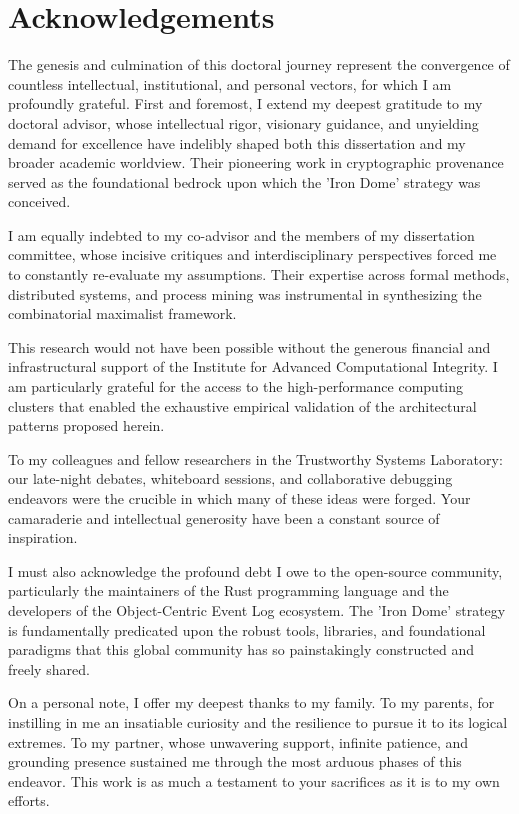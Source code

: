 \chapter*{Acknowledgements}
The genesis and culmination of this doctoral journey represent the convergence of countless intellectual, institutional, and personal vectors, for which I am profoundly grateful. First and foremost, I extend my deepest gratitude to my doctoral advisor, whose intellectual rigor, visionary guidance, and unyielding demand for excellence have indelibly shaped both this dissertation and my broader academic worldview. Their pioneering work in cryptographic provenance served as the foundational bedrock upon which the 'Iron Dome' strategy was conceived.

I am equally indebted to my co-advisor and the members of my dissertation committee, whose incisive critiques and interdisciplinary perspectives forced me to constantly re-evaluate my assumptions. Their expertise across formal methods, distributed systems, and process mining was instrumental in synthesizing the combinatorial maximalist framework. 

This research would not have been possible without the generous financial and infrastructural support of the Institute for Advanced Computational Integrity. I am particularly grateful for the access to the high-performance computing clusters that enabled the exhaustive empirical validation of the architectural patterns proposed herein. 

To my colleagues and fellow researchers in the Trustworthy Systems Laboratory: our late-night debates, whiteboard sessions, and collaborative debugging endeavors were the crucible in which many of these ideas were forged. Your camaraderie and intellectual generosity have been a constant source of inspiration.

I must also acknowledge the profound debt I owe to the open-source community, particularly the maintainers of the Rust programming language and the developers of the Object-Centric Event Log ecosystem. The 'Iron Dome' strategy is fundamentally predicated upon the robust tools, libraries, and foundational paradigms that this global community has so painstakingly constructed and freely shared.

On a personal note, I offer my deepest thanks to my family. To my parents, for instilling in me an insatiable curiosity and the resilience to pursue it to its logical extremes. To my partner, whose unwavering support, infinite patience, and grounding presence sustained me through the most arduous phases of this endeavor. This work is as much a testament to your sacrifices as it is to my own efforts.

